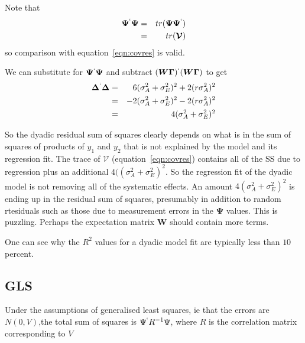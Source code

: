 \documentclass[titlepage]{article}  %
\begin{document}
Note that 
\begin{eqnarray*}
\bm{\Psi}^{`}\bm{\Psi} & = & tr(\bm{\Psi}\bm{\Psi}^{`}) \\
                       & = & tr(\bm{\mathcal{V}})
\end{eqnarray*}
so comparison with equation~\ref{eqn:covres} is valid. 

We can substitute for $\bm{\Psi}^{`}\bm{\Psi}$ and subtract $(\bm{W}\bm{\Gamma})^{`} (\bm{W}\bm{\Gamma})$ to get
\begin{eqnarray*}
\bm{\Delta}^{`} \bm{\Delta} & = & 6(\sigma^{2}_{A} + \sigma^{2}_{E})^{2} + 2(r \sigma^{2}_{A})^{2} \\
   & = & - 2(\sigma^{2}_{A} + \sigma^{2}_{E})^{2} - 2(r \sigma^{2}_{A})^{2} \\
   & = &  4(\sigma^{2}_{A} + \sigma^{2}_{E})^{2}
\end{eqnarray*}


So the dyadic residual sum of squares clearly depends on what is in the sum of squares of products of $y_{1}$ and $y_{2}$ that is not explained by the model and its regression fit.  The trace of $\bm{\mathcal{V}}$ (equation~\ref{eqn:covres}) contains all of the SS due to regression plus an additional $4((\sigma^{2}_{A} + \sigma^{2}_{E})^{2}$. So the regression fit of the dyadic model is not removing all of the systematic effects. An amount $4(\sigma^{2}_{A} + \sigma^{2}_{E})^{2}$ is ending up in the residual sum of squares, presumably in addition to random rtesiduals such as those due to measurement errors in the $\bm{\Psi}$ values. This is puzzling. Perhaps the expectation matrix $\bm{W}$ should contain more terms. 

One can see why the $R^{2}$ values for a dyadic model fit are typically less than $10$ percent.




\subsection{GLS}
Under the assumptions of generalised least squares, ie that the errors are $N(0,V)$,the total sum of squares is $\Psi^{`} R^{-1} \Psi$, where $R$ is the correlation matrix corresponding to $V$  
\end{document}

